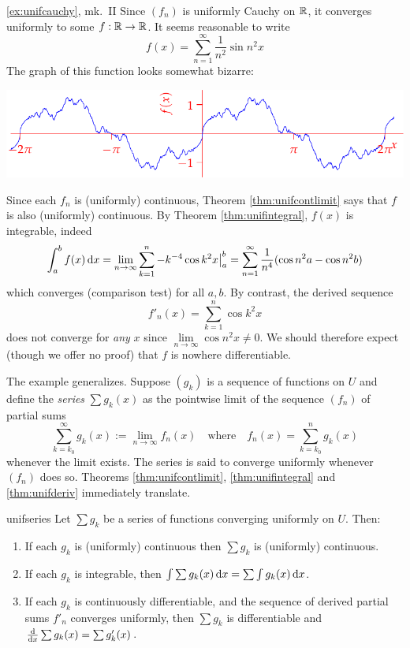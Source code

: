 \begin{example*}{\ref{ex:unifcauchy}, mk.\ II}{}
	Since $(f_n)$ is uniformly Cauchy on $\mathbb{R}$, it converges uniformly to some $f:\mathbb{R}\to\mathbb{R}$. It seems reasonable to write
	\[
		f(x)=\sum\limits_{n=1}^\infty\frac 1{n^2}\sin n^2x
	\]
	The graph of this function looks somewhat bizarre:
	\begin{center}
		\includegraphics[scale=0.95]{unifcauchy}
	\end{center}
	Since each $f_n$ is (uniformly) continuous, Theorem \ref{thm:unifcontlimit} says that $f$ is also (uniformly) continuous. By Theorem \ref{thm:unifintegral}, $f(x)$ is integrable, indeed
	\[
		\int_a^bf(x)\,{\mathrm{d} x}
		=\lim_{n\to\infty}\sum_{k=1}^n -k^{-4}\cos k^2x\big|_a^b 
		=\sum_{n=1}^\infty \frac 1{n^4}(\cos n^2a-\cos n^2b)
	\]
	which converges (comparison test) for all $a,b$. By contrast, the derived sequence 
	\[
		f'_n(x)=\sum\limits_{k=1}^n \cos k^2x
	\]
	does not converge for \emph{any} $x$ since $\lim\limits_{n\to\infty}\cos n^2x\neq 0$. We should therefore expect (though we offer no proof) that $f$ is nowhere differentiable.
\end{example*}


\goodbreak


The example generalizes. Suppose $(g_k)$ is a sequence of functions on $U$ and define the \emph{series} $\sum g_k(x)$ as the pointwise limit of the sequence $(f_n)$ of partial sums
\[
	\sum_{k=k_0}^\infty g_k(x):=\lim\limits_{n\to\infty}f_n(x)
	\quad\text{where}\quad 
	f_n(x)=\sum_{k=k_0}^ng_k(x)
\]
whenever the limit exists. The series is said to converge uniformly whenever $(f_n)$ does so. Theorems \ref{thm:unifcontlimit}, \ref{thm:unifintegral} and \ref{thm:unifderiv} immediately translate.

\begin{cor}{}{unifseries}
	Let $\sum g_k$ be a series of functions converging uniformly on $U$. Then:
	\begin{enumerate}
	  \item If each $g_k$ is (uniformly) continuous then $\sum g_k$ is (uniformly) continuous.
	  \item If each $g_k$ is integrable, then $\int\sum g_k(x)\,{\mathrm{d} x}=\sum\int g_k(x)\,{\mathrm{d} x}$.
	  \item If each $g_k$ is continuously differentiable, and the sequence of derived partial sums $f'_n$ converges uniformly, then $\sum g_k$ is differentiable and $\frac{\mathrm{d} }{\mathrm{d} x}\sum g_k(x)=\sum g'_k(x)$.
	\end{enumerate}
\end{cor}

